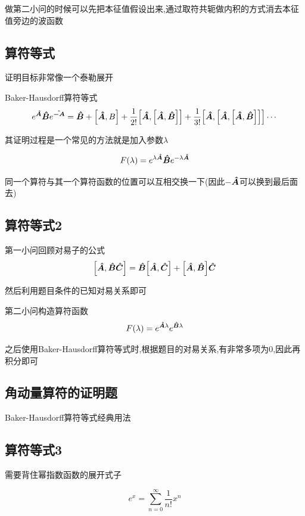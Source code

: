 \documentclass{article}
\begin{document}
            做第二小问的时候可以先把本征值假设出来,通过取符共轭做内积的方式消去本征值旁边的波函数

        \subsection{算符等式}
            \begin{formal}
                证明目标非常像一个泰勒展开

                Baker-Hausdorff算符等式
                $$ e^{\vu*{A}} \vu*{B} e^{\vu*{-A}} = \vu*{B} + \comm{\vu*{A}}{B} + \frac{1}{2!} \comm{\vu*{A}}{\comm{\vu*{A}}{\vu*{B}}} + \frac{1}{3!} \comm{\vu*{A}}{\comm{\vu*{A}}{\comm{\vu*{A}}{\vu*{B}}}} \cdots $$

                其证明过程是一个常见的方法就是加入参数$\lambda$ 

                $$ F(\lambda) = e^{\lambda \vu*{A}} \vu*{B} e^{-\lambda \vu*{A}} $$

                同一个算符与其一个算符函数的位置可以互相交换一下(因此$-\vu*{A}$可以换到最后面去)
            \end{formal}

        \subsection{算符等式2}
            第一小问回顾对易子的公式
            $$ \comm{\vu*{A}}{\vu*{B}\vu*{C}} = \vu*{B} \comm{\vu*{A}}{\vu*{C}} + \comm{\vu*{A}}{\vu*{B}}\vu*{C} $$
        
            然后利用题目条件的已知对易关系即可

            第二小问构造算符函数
            $$ F(\lambda) = e^{\vu*{A} \lambda} e^{\vu*{B} \lambda} $$

            之后使用Baker-Hausdorff算符等式时,根据题目的对易关系,有非常多项为0,因此再积分即可
        
        \subsection{角动量算符的证明题}
            Baker-Hausdorff算符等式经典用法

        \subsection{算符等式3}
            需要背住幂指数函数的展开式子
            \begin{formal}
                $$ e^{x} = \sum_{n=0}^{\infty} \frac{1}{n!} x^{n}  $$
            \end{formal}
        
\end{document}
